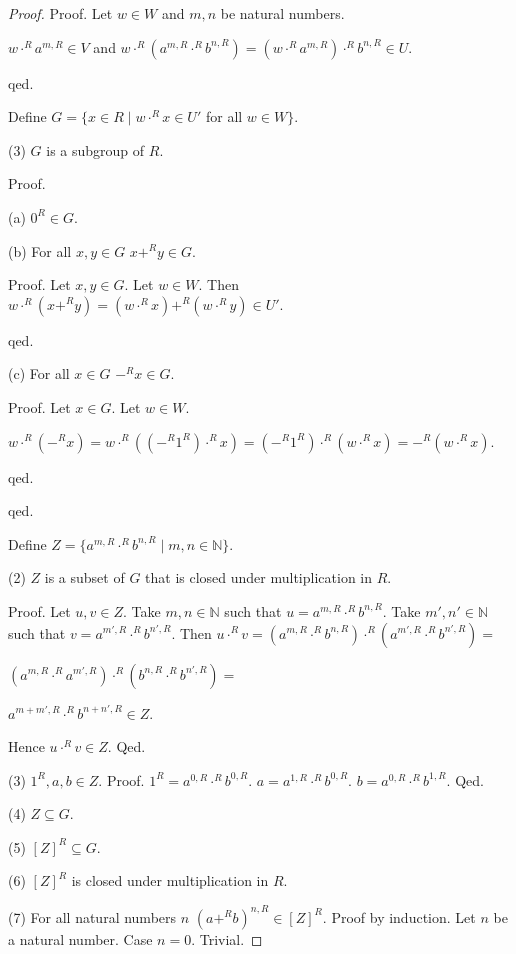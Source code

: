 \documentclass[english,11pt]{article}
\begin{document}
\begin{forthel}
\begin{proof}
Proof. Let $w \in W$ and $m,n$ be natural numbers.

$w \cdot^{R} a^{m,R} \in V$ and
$w \cdot^{R} (a^{m,R} \cdot^{R} b^{n,R}) =
(w \cdot^{R} a^{m,R}) \cdot^{R} b^{n,R} \in U$.
 
qed.

Define $G = \{x \in R \mid w \cdot^{R} x \in U'$ for all $w \in W\}$.

(3) $G$ is a subgroup of $R$. 

Proof.
 
(a) $0^{R} \in G$.

(b) For all $x,y \in G$ $x +^{R} y \in G$.

Proof. Let $x,y \in G$.
Let $w \in W$. Then
$w \cdot^{R} (x +^{R} y)
= (w \cdot^{R} x) +^{R} (w \cdot^{R} y) \in U'$.

qed.

(c) For all $x \in G$ $-^{R} x \in G$.

Proof. Let $x \in G$. Let $w \in W$.

$w \cdot^{R} (-^{R} x) = 
w \cdot^{R} ((-^{R} 1^{R}) \cdot^{R} x) =
(-^{R} 1^{R}) \cdot^{R} (w \cdot^{R} x) =
-^{R} (w \cdot^{R} x)
$.

qed.

qed.

Define $Z = \{a^{m,R} \cdot^{R} b^{n,R} \mid m,n \in \mathbb{N}\}$.

(2) $Z$ is a subset of $G$ that is closed under multiplication in $R$.

Proof.
Let $u,v \in Z$.
Take $m,n \in \mathbb{N}$ such that
$u = a^{m,R} \cdot^{R} b^{n,R}$.
Take $m',n' \in \mathbb{N}$ such that
$v = a^{m',R} \cdot^{R} b^{n',R}$.
Then
$u \cdot^{R} v = 
(a^{m,R} \cdot^{R} b^{n,R}) \cdot^{R} (a^{m',R} \cdot^{R} b^{n',R}) =$

$(a^{m,R} \cdot^{R} a^{m',R}) \cdot^{R} (b^{n,R} \cdot^{R} b^{n',R}) =$

$a^{m+m',R} \cdot^{R} b^{n+n',R} \in Z$.

Hence $u \cdot^{R} v \in Z$.
Qed.

(3) $1^{R},a,b \in Z$.
Proof.
$1^{R} = a^{0,R} \cdot^{R} b^{0,R}$.
$a = a^{1,R} \cdot^{R} b^{0,R}$.
$b = a^{0,R} \cdot^{R} b^{1,R}$.
Qed.

(4) $Z \subseteq G$.

(5) $[Z]^{R} \subseteq G$.

(6) $[Z]^{R}$ is closed under multiplication in $R$.

(7) For all natural numbers $n$ $(a +^{R} b)^{n,R} \in [Z]^{R}$.
Proof by induction. Let $n$ be a natural number.
Case $n = 0$. Trivial.


\end{proof}
\end{forthel}
\end{document}
